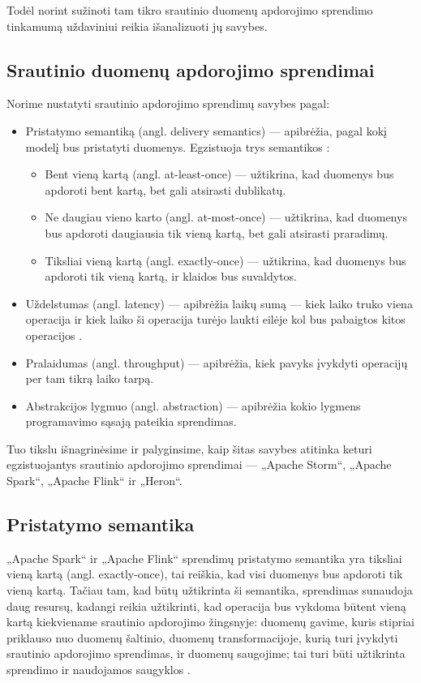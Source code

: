 \documentclass{VUMIFPSbakalaurinis}
\begin{document}
Todėl norint sužinoti tam tikro srautinio duomenų apdorojimo sprendimo tinkamumą uždaviniui reikia išanalizuoti jų savybes.   
\subsection{Srautinio duomenų apdorojimo sprendimai}

Norime nustatyti srautinio apdorojimo sprendimų savybes pagal:
\begin{itemize}
    \item Pristatymo semantiką (angl. delivery semantics) — apibrėžia, pagal kokį modelį bus pristatyti duomenys. Egzistuoja trys semantikos \cite{ensar20}: 
    \begin{itemize}
        \item Bent vieną kartą (angl. at-least-once) — užtikrina, kad duomenys bus apdoroti bent kartą, bet gali atsirasti dublikatų. 
        \item Ne daugiau vieno karto (angl. at-most-once) — užtikrina, kad duomenys bus apdoroti daugiausia tik vieną kartą, bet gali atsirasti praradimų. 
        \item Tiksliai vieną kartą (angl. exactly-once) — užtikrina, kad duomenys bus apdoroti tik vieną kartą, ir klaidos bus suvaldytos.
    \end{itemize}
    \item Uždelstumas (angl. latency) — apibrėžia laikų sumą — kiek laiko truko viena operacija ir kiek laiko ši operacija turėjo laukti eilėje kol bus pabaigtos kitos operacijos \cite{karimov2018benchmarking}.
    \item Pralaidumas (angl. throughput) — apibrėžia, kiek pavyks įvykdyti operacijų per tam tikrą laiko tarpą.
    \item Abstrakcijos lygmuo (angl. abstraction) — apibrėžia kokio lygmens programavimo sąsają pateikia sprendimas.
\end{itemize}
Tuo tikslu išnagrinėsime ir palyginsime, kaip šitas savybes atitinka keturi egzistuojantys srautinio apdorojimo sprendimai — „Apache Storm“, „Apache Spark“, „Apache Flink“ ir „Heron“.

\subsection{Pristatymo semantika}
„Apache Spark“ ir „Apache Flink“ sprendimų pristatymo semantika yra tiksliai vieną kartą (angl. exactly-once), tai reiškia, kad visi duomenys bus apdoroti tik vieną kartą. Tačiau tam, kad būtų užtikrinta ši semantika, sprendimas sunaudoja daug resursų, kadangi reikia užtikrinti, kad operacija bus vykdoma būtent vieną kartą kiekviename srautinio apdorojimo žingsnyje: duomenų gavime, kuris stipriai priklauso nuo duomenų šaltinio, duomenų transformacijoje, kurią turi įvykdyti srautinio apdorojimo sprendimas, ir duomenų saugojime; tai turi būti užtikrinta sprendimo ir naudojamos saugyklos \cite{zhang20}.\par
\end{document}
